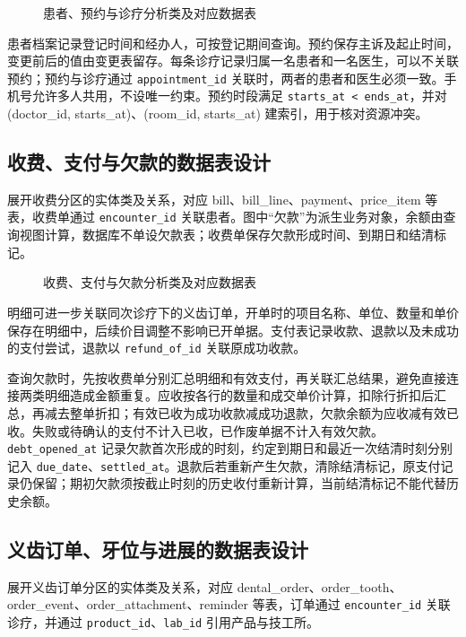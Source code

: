 \begin{figure}[H]\centering
{}
\caption{患者、预约与诊疗分析类及对应数据表}\label{fig:erd-patient}
\end{figure}

患者档案记录登记时间和经办人，可按登记期间查询。预约保存主诉及起止时间，变更前后的值由变更表留存。每条诊疗记录归属一名患者和一名医生，可以不关联预约；预约与诊疗通过 \texttt{appointment\_id} 关联时，两者的患者和医生必须一致。手机号允许多人共用，不设唯一约束。预约时段满足 \texttt{starts\_at < ends\_at}，并对 (doctor\_id, starts\_at)、(room\_id, starts\_at) 建索引，用于核对资源冲突。

\clearpage
\subsection{收费、支付与欠款的数据表设计}
 展开收费分区的实体类及关系，对应 bill、bill\_line、payment、price\_item 等表，收费单通过 \texttt{encounter\_id} 关联患者。图中“欠款”为派生业务对象，余额由查询视图计算，数据库不单设欠款表；收费单保存欠款形成时间、到期日和结清标记。

\begin{figure}[H]\centering
{}
\caption{收费、支付与欠款分析类及对应数据表}\label{fig:erd-billing}
\end{figure}

明细可进一步关联同次诊疗下的义齿订单，开单时的项目名称、单位、数量和单价保存在明细中，后续价目调整不影响已开单据。支付表记录收款、退款以及未成功的支付尝试，退款以 \texttt{refund\_of\_id} 关联原成功收款。

查询欠款时，先按收费单分别汇总明细和有效支付，再关联汇总结果，避免直接连接两类明细造成金额重复。应收按各行的数量和成交单价计算，扣除行折扣后汇总，再减去整单折扣；有效已收为成功收款减成功退款，欠款余额为应收减有效已收。失败或待确认的支付不计入已收，已作废单据不计入有效欠款。\texttt{debt\_opened\_at} 记录欠款首次形成的时刻，约定到期日和最近一次结清时刻分别记入 \texttt{due\_date}、\texttt{settled\_at}。退款后若重新产生欠款，清除结清标记，原支付记录仍保留；期初欠款须按截止时刻的历史收付重新计算，当前结清标记不能代替历史余额。

\clearpage
\subsection{义齿订单、牙位与进展的数据表设计}
 展开义齿订单分区的实体类及关系，对应 dental\_order、order\_tooth、order\_event、order\_attachment、reminder 等表，订单通过 \texttt{encounter\_id} 关联诊疗，并通过 \texttt{product\_id}、\texttt{lab\_id} 引用产品与技工所。

